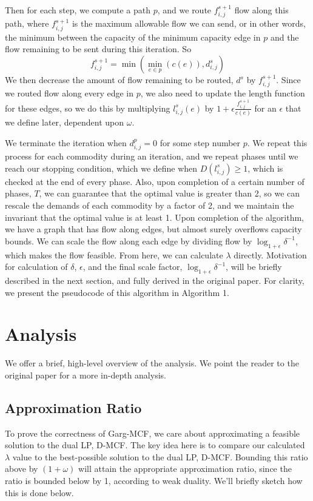 Then for each step, we compute a path $p$,
and we route $f_{i,j}^{s+1}$ flow along this path, where
$f_{i,j}^{s+1}$ is the maximum allowable flow we can send, or in other
words, the minimum between the capacity of the minimum capacity edge
in $p$ and the flow remaining to be sent during this iteration. So
$$f_{i,j}^{s+1}=\min(\min_{e\in p}(c(e)),d_{i,j}^s)$$
We then decrease the amount of flow remaining to be routed, $d^s$ by
$f_{i,j}^{s+1}$. Since we routed flow along every edge in $p$, we also
need to update the length function for these edges, so we do this by
multiplying $l_{i,j}^s(e)$ by $1+\epsilon \frac{f_{i,j}^{s+1}}{c(e)}$ for an
$\epsilon$ that we define later, dependent upon $\omega$. 

We terminate
the iteration when $d_{i,j}^p=0$ for some step number $p$. We repeat
this process for each commodity during an iteration, and we repeat
phases until we reach our stopping condition, which we define when 
$D(l_{i,j}^s)\geq 1$, which is checked at the end of every
phase. Also, upon completion of a certain number of phases, $T$, we can
guarantee that the optimal value is greater than 2, so we can rescale
the demands of each commodity by a factor of 2, and we maintain the
invariant that the optimal value is at least 1. 
Upon completion of the algorithm, we have a graph that has flow along edges, but
almost surely overflows capacity bounds. We can scale the flow along each edge by
dividing flow by $\log_{1+\epsilon}\delta^{-1}$, which makes the
flow feasible. From here, we can calculate $\lambda$
directly. Motivation for calculation of $\delta$, $\epsilon$, and the
final scale factor, $\log_{1+\epsilon}\delta^{-1}$, will be
briefly described in the next section, and fully derived in the
original paper. 
For clarity, we present the pseudocode of this
algorithm in Algorithm 1.


\section{Analysis}
We offer a brief, high-level overview of the analysis. We point the
reader to the original paper for a more in-depth analysis.
\subsection{Approximation Ratio}
To prove the correctness of Garg-MCF, we care about approximating a
feasible solution to the dual LP, D-MCF. The key idea here is to compare
our calculated $\lambda$ value to the best-possible solution to the
dual LP, D-MCF. Bounding this ratio above by $(1+\omega)$ will attain
the appropriate approximation ratio, since the ratio is bounded below
by 1, according to weak duality. We'll briefly sketch how this is
done below.


